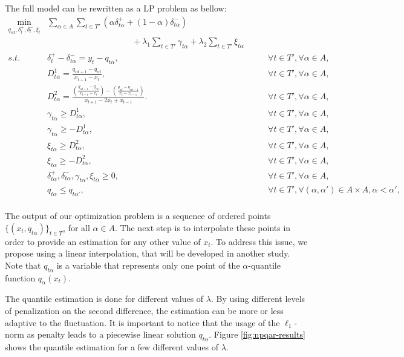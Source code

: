 The full model can be rewritten as a LP problem as bellow:
\begin{eqnarray}
\min_{q_{\alpha t},\delta^+_{t}, \delta_t^-, \xi_t} & \sum_{\alpha \in A} \sum_{t \in T'}\left(\alpha\delta_{t \alpha }^{+}+(1-\alpha)\delta_{t \alpha }^{-}\right) & \\
& \qquad \qquad \qquad \qquad \qquad + \lambda_1\sum_{t \in T'}\gamma_{t \alpha } + \lambda_2\sum_{t \in T'}\xi_{t \alpha } & \nonumber \\
s.t. & \delta_{t}^{+}-\delta_{t \alpha }^{-}=y_{t}-q_{t \alpha }, & \qquad\forall t \in T',\forall \alpha \in A,\\
   & D^{1}_{t \alpha }=\frac{q_{\alpha t+1}-q_{\alpha t}}{x_{t+1}-x_{t}},
    & \qquad\forall t \in T',\forall \alpha \in A,\\   
 & D^{2}_{t \alpha }=\frac{\left(\frac{q_{\alpha t+1}-q_{\alpha t}}{x_{t+1}-x_{t}}\right)-\left(\frac{q_{\alpha t}-q_{\alpha t-1}}{x_{t}-x_{t-1}}\right)}{x_{t+1}-2x_{t} + x_{t-1}}.
  & \qquad\forall t \in T',\forall \alpha \in A,\\
 & \gamma_{t \alpha}\geq D^1_{t \alpha }, & \qquad\forall t \in T',\forall \alpha \in A,\\
  & \gamma_{t \alpha}\geq-D^1_{t \alpha}, & \qquad\forall t \in T',\forall \alpha \in A,\\
  & \xi_{t \alpha}\geq D^2_{t \alpha }, & \qquad\forall t \in T',\forall \alpha \in A,\\
 & \xi_{t \alpha}\geq-D^2_{t \alpha}, & \qquad\forall t \in T',\forall \alpha \in A,\\
 & \delta_{t \alpha}^{+},\delta_{t \alpha}^{-},\gamma_{t \alpha}, \xi_{t \alpha}\geq0, & \qquad\forall t \in T',\forall \alpha \in A,\\
  & q_{t \alpha} \leq q_{t \alpha'}, & \qquad \forall t \in T', \forall (\alpha, \alpha') \in A \times A, \alpha < \alpha',\nonumber \\  
  \end{eqnarray}


The output of our optimization problem is a sequence of ordered points $\{(x_t, q_{t \alpha})\}_{t \in T}$, for all $\alpha \in A$. The next step is to interpolate these points in order to provide an estimation for any other value of $x_t$. To address this issue, we propose using a linear interpolation, that will be developed in another study. Note that $q_{t \alpha}$ is a variable that represents only one point of the $\alpha$-quantile function $q_\alpha(x_t)$. 

The quantile estimation is done for different values of $\lambda$. By using different levels of penalization on the second difference, the estimation can be more or less adaptive to the fluctuation. It is important to notice that the usage of the $\ell_1$-norm as penalty leads to a piecewise linear solution $q_{t \alpha}$. %
Figure \ref{fig:npqar-results} shows the quantile estimation for a few different values of $\lambda$. 

